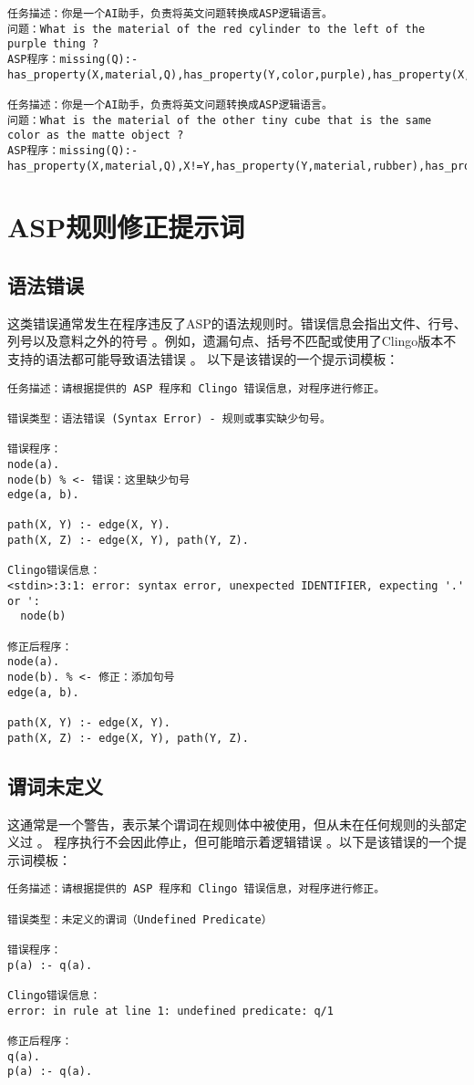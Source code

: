 \begin{lstlisting}
任务描述：你是一个AI助手，负责将英文问题转换成ASP逻辑语言。
问题：What is the material of the red cylinder to the left of the purple thing ? 
ASP程序：missing(Q):-has_property(X,material,Q),has_property(Y,color,purple),has_property(X,color,red),has_property(X,shape,cylinder),left(Y,X),X!=Y. 

任务描述：你是一个AI助手，负责将英文问题转换成ASP逻辑语言。
问题：What is the material of the other tiny cube that is the same color as the matte object ? 
ASP程序：missing(Q):-has_property(X,material,Q),X!=Y,has_property(Y,material,rubber),has_property(X,shape,cube),has_property(X,size,small),same_color(Y,X). 
\end{lstlisting}

\section{ASP规则修正提示词}
\label{appendix:rule-fix}
\subsection{语法错误}
这类错误通常发生在程序违反了ASP的语法规则时。错误信息会指出文件、行号、列号以及意料之外的符号 。例如，遗漏句点、括号不匹配或使用了Clingo版本不支持的语法都可能导致语法错误 。
以下是该错误的一个提示词模板：
\begin{lstlisting}
任务描述：请根据提供的 ASP 程序和 Clingo 错误信息，对程序进行修正。

错误类型：语法错误 (Syntax Error) - 规则或事实缺少句号。

错误程序：
node(a).
node(b) % <- 错误：这里缺少句号
edge(a, b).

path(X, Y) :- edge(X, Y).
path(X, Z) :- edge(X, Y), path(Y, Z).

Clingo错误信息：
<stdin>:3:1: error: syntax error, unexpected IDENTIFIER, expecting '.' or ':
  node(b)

修正后程序：
node(a).
node(b). % <- 修正：添加句号
edge(a, b).

path(X, Y) :- edge(X, Y).
path(X, Z) :- edge(X, Y), path(Y, Z).
\end{lstlisting}
\subsection{谓词未定义}
这通常是一个警告，表示某个谓词在规则体中被使用，但从未在任何规则的头部定义过 。
程序执行不会因此停止，但可能暗示着逻辑错误 。以下是该错误的一个提示词模板：
\begin{lstlisting}
任务描述：请根据提供的 ASP 程序和 Clingo 错误信息，对程序进行修正。

错误类型：未定义的谓词（Undefined Predicate）

错误程序：
p(a) :- q(a).

Clingo错误信息：
error: in rule at line 1: undefined predicate: q/1

修正后程序：
q(a).
p(a) :- q(a).
\end{lstlisting}
